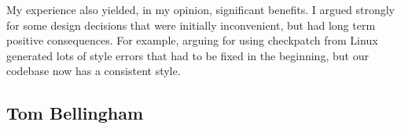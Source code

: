 \documentclass[11pt]{article}
\begin{document}
My experience also yielded, in my opinion, significant benefits. I argued
strongly for some design decisions that were initially inconvenient, but had
long term positive consequences. For example, arguing for using checkpatch from
Linux generated lots of style errors that had to be fixed in the beginning, but
our codebase now has a consistent style.

\subsection{Tom Bellingham}
\end{document}
